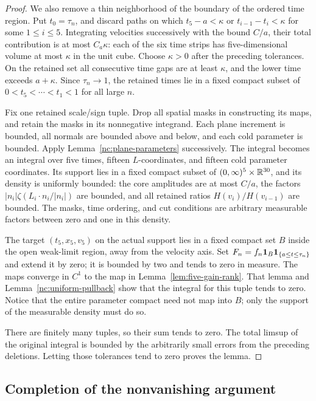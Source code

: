 \begin{proof}
We also remove a thin neighborhood of the boundary of the ordered
time region. Put \(t_0=\tau_n\), and discard paths on which
\(t_5-a<\kappa\) or \(t_{i-1}-t_i<\kappa\) for some
\(1\le i\le5\). Integrating velocities successively with the
bound \(C/a\), their total contribution is at most
\(C_a\kappa\): each of the six time strips has five-dimensional
volume at most \(\kappa\) in the unit cube. Choose \(\kappa>0\)
after the preceding tolerances. On the retained set all consecutive
time gaps are at least \(\kappa\), and the lower time exceeds
\(a+\kappa\). Since \(\tau_n\to1\), the retained times lie in a
fixed compact subset of \(0<t_5<\cdots<t_1<1\) for all large \(n\).

Fix one retained scale/sign tuple. Drop all spatial masks in
constructing its maps, and retain the masks in its nonnegative
integrand.  Each plane increment is bounded, all normals are
bounded above and below, and each cold parameter is bounded.
Apply Lemma~\ref{nc:plane-parameters} successively.  The integral
becomes an integral over five times, fifteen \(L\)-coordinates,
and fifteen cold parameter coordinates.  Its support lies in
a fixed compact subset of
\((0,\infty)^5\times\mathbb R^{30}\), and its density is uniformly
bounded: the core amplitudes are at most \(C/a\), the factors
\(|n_i|\zeta(L_i\cdot n_i/|n_i|)\) are bounded, and all retained
ratios \(H(v_i)/H(v_{i-1})\) are bounded.  The masks, time
ordering, and cut conditions are arbitrary measurable factors
between zero and one in this density.

The target \((t_5,x_5,v_5)\) on the actual support lies in a
fixed compact set \(B\) inside the open weak-limit region, away
from the velocity axis.  Set
\(F_n=f_n\mathbf 1_B\mathbf 1_{\{a\le t\le\tau_n\}}\) and extend it by zero;
it is bounded by two and tends to zero in measure.  The maps converge
in \(C^1\) to the map in Lemma~\ref{lem:five-gain-rank}.
That lemma and Lemma~\ref{nc:uniform-pullback} show that the
integral for this tuple tends to zero.  Notice that the entire
parameter compact need not map into \(B\); only the support of
the measurable density must do so.

There are finitely many tuples, so their sum tends to zero.
The total limsup of the original integral is bounded by the
arbitrarily small errors from the preceding deletions.
Letting those tolerances tend to zero proves the lemma.
\end{proof}

\subsection{Completion of the nonvanishing argument}

